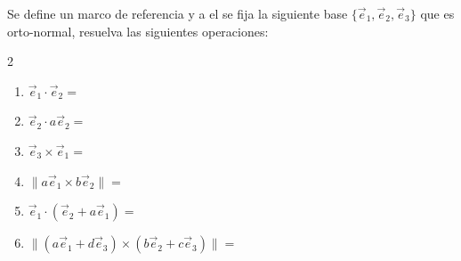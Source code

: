 Se define un marco de referencia y a el se fija la siguiente base $\{\Vec{e}_1,\Vec{e}_2,\Vec{e}_3\}$ que es orto-normal, resuelva las siguientes operaciones:
\begin{multicols}{2}
\begin{enumerate}
    \item$\Vec{e}_1\cdot\Vec{e}_2=$
    \item$\Vec{e}_2\cdot a\Vec{e}_2=$
    \item$\Vec{e}_3\times \Vec{e}_1=$
    \item$\|a\Vec{e}_1\times b\Vec{e}_2\|=$
    \item$\Vec{e}_1\cdot (\Vec{e}_2+a\Vec{e}_1 )=$
    \item$\|(a\Vec{e}_1+d\Vec{e}_3)\times (b\Vec{e}_2+c\Vec{e}_3)\|=$
\end{enumerate}
\end{multicols}
